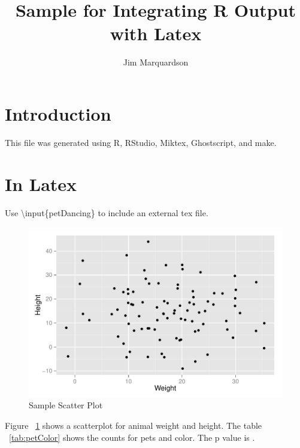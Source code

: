 \documentclass[letterpaper,twoside,10pt]{article}
\begin{document}
\pagestyle{empty} %

\title{Sample for Integrating R Output with Latex}
\author{Jim Marquardson}
\maketitle

\pagestyle{plain} %

\section{Introduction}\label{Introduction}

This file was generated using R, RStudio, Miktex, Ghostscript, and make.

\section{In Latex}\label{InLatex}

Use \textbackslash{}input\{petDancing\} to include an external tex file.

\begin{figure}[htb]
  \centering
		\includegraphics{../figures/scatter.pdf}
	\caption{Sample Scatter Plot}
	\label{fig:scatter}
\end{figure}

Figure ~\ref{fig:scatter} shows a scatterplot for animal weight and height. The table ~\ref{tab:petColor} shows the counts for pets and color. The p value is \unskip.


\end{document}
